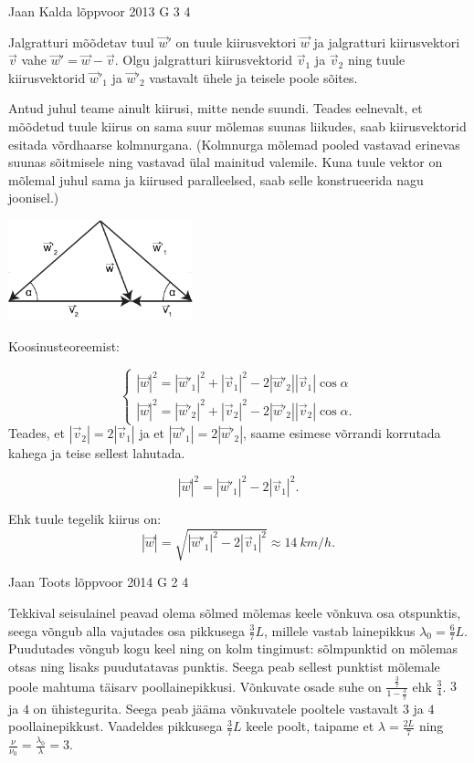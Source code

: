 \documentclass[11pt, twoside]{article}
\begin{document}
{%
{Jaan Kalda} %
{lõppvoor} %
{2013} %
{G 3} %
{4} %
{

\ifSolution
Jalgratturi mõõdetav tuul $\vec w'$ on tuule kiirusvektori $\vec w$ ja jalgratturi kiirusvektori $\vec v$ vahe $\vec w'=\vec w - \vec v$. Olgu jalgratturi kiirusvektorid $\vec v_1$ ja $\vec v_2$ ning tuule kiirusvektorid  $\vec w'_1$ ja $\vec w'_2$ vastavalt ühele ja teisele poole sõites.

Antud juhul teame ainult kiirusi, mitte nende suundi. Teades eelnevalt, et mõõdetud tuule kiirus on sama suur mõlemas suunas liikudes, saab kiirusvektorid esitada võrdhaarse kolmnurgana. (Kolmnurga mõlemad pooled vastavad erinevas suunas sõitmisele ning vastavad ülal mainitud valemile. Kuna tuule vektor on mõlemal juhul sama ja kiirused paralleelsed, saab selle konstrueerida nagu joonisel.)

\begin{center}
\includegraphics[width=0.4\textwidth]{2013-v3g-03-jalgrattur}\\
\end{center}

Koosinusteoreemist: 

$$
\begin{cases}
|\vec w|^2 = |\vec w'_1|^2 + |\vec v_1|^2  - 2  |\vec w'_2|  |\vec v_1|\cos \alpha \\
|\vec w|^2 = |\vec w'_2|^2 + |\vec v_2|^2  - 2  |\vec w'_2|  |\vec v_2|\cos \alpha.
\end{cases}
$$
Teades, et $ |\vec v_2|=2 |\vec v_1|$ ja et  $ |\vec w'_1|=2 |\vec w'_2|$, saame esimese võrrandi korrutada kahega ja teise sellest lahutada.

$$|\vec w|^2 = |\vec w'_1|^2 - 2|\vec v_1|^2. $$

Ehk  tuule tegelik kiirus on:
$$|\vec w|=\sqrt{|\vec w'_1|^2-2|\vec v_1|^2} \approx \SI{14}{km \per h}.$$
\fi
}

{Jaan Toots} %
{lõppvoor} %
{2014} %
{G 2} %
{4} %
{

\ifSolution
Tekkival seisulainel peavad olema sõlmed mõlemas keele võnkuva osa otspunktis, seega võngub alla vajutades osa pikkusega $\frac{3}{7}L$, millele vastab lainepikkus $\lambda_0=\frac{6}{7}L$. Puudutades võngub kogu keel ning on kolm tingimust: sõlmpunktid on mõlemas otsas ning lisaks puudutatavas punktis. Seega peab sellest punktist mõlemale poole mahtuma täisarv poollainepikkusi. Võnkuvate osade suhe on $\frac{\frac{3}{7}}{1-\frac{3}{7}}$ ehk $\frac{3}{4}$. $3$ ja $4$ on ühistegurita. Seega peab jääma võnkuvatele pooltele vastavalt $3$ ja $4$ poollainepikkust. Vaadeldes pikkusega $\frac{3}{7}L$ keele poolt, taipame et $\lambda=\frac{2L}{7}$ ning $\frac{\nu}{\nu_0}=\frac{\lambda_0}{\lambda}=3$.
\fi
}

}
\end{document}
